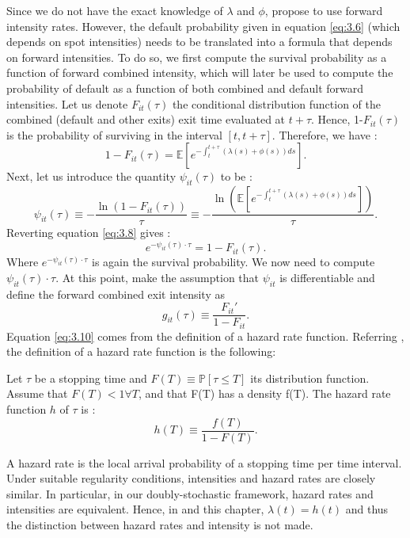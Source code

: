 Since we do not have the exact knowledge of $\lambda$ and $\phi$, \citet{Duan2012} propose to use forward intensity rates. However, the default probability given in equation \ref{eq:3.6} (which depends on spot intensities) needs to be translated into a formula that depends on forward intensities. To do so, we first compute the survival probability as a function of forward combined intensity, which will later be used to compute the probability of default as a function of both combined and default forward intensities. Let us denote $F_{it}(\tau)$ the conditional distribution function of the combined (default and other exits) exit time evaluated at $t+\tau$. Hence, 1-$F_{it}(\tau)$ is the probability of surviving in the interval $[t, t+\tau ]$. Therefore, we have :
\begin{equation}
1-F_{it}(\tau) = \mathbb{E}[e^{-\int_t^{t+\tau} (\lambda(s)+\phi(s)) ds}].
\end{equation}
Next, let us introduce the quantity $\psi_{it}(\tau)$ to be :
\begin{equation} \label{eq:3.8}
\psi_{it}(\tau) \equiv -\frac{\ln(1-F_{it}(\tau))}{\tau} \equiv -\frac{\ln(\mathbb{E}[e^{-\int_t^{t+\tau} (\lambda(s)+\phi(s)) ds}])}{\tau}.
\end{equation}
Reverting equation \ref{eq:3.8} gives :
\begin{equation}\label{eq:psi}
e^{-\psi_{it}(\tau)\cdot\tau} = 1-F_{it}(\tau).
\end{equation}
Where $e^{-\psi_{it}(\tau)\cdot\tau}$ is again the survival probability. We now need to compute $\psi_{it}(\tau)\cdot\tau$. At this point, \citet{Duan2012} make the assumption that $\psi_{it}$ is differentiable and define the forward combined exit intensity as 
\begin{equation} \label{eq:3.10}
g_{it}(\tau) \equiv \frac{F_{it}'}{1-F_{it}}.
\end{equation}
Equation \ref{eq:3.10} comes from the definition of a hazard rate function. Referring \citet{book}, the definition of a hazard rate function is the following:
\begin{definition}
Let $\tau$ be a stopping time and $F(T) \equiv \mathbb{P}[\tau \leq T]$ its distribution function. Assume that $F(T) < 1 \forall T$, and that F(T) has a density f(T). The hazard rate function $h$ of $\tau$ is :
\begin{equation*}
h(T) \equiv \frac{f(T)}{1-F(T)}.
\end{equation*}
\end{definition}
A hazard rate is the local arrival probability of a stopping time per time interval. Under suitable regularity conditions, intensities and hazard rates are closely similar. In particular, in our doubly-stochastic framework, hazard rates and intensities are equivalent. Hence, in \citet{Duan2012} and this chapter, $\lambda(t) = h(t)$ and thus the distinction between hazard rates and intensity is not made. \\

